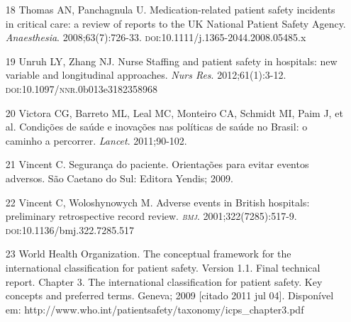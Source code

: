 \documentclass{article}
\begin{document}
\begin{itemize}
\item[18] Thomas AN, Panchagnula U. Medication-related patient safety
incidents in
critical care: a review of reports to the UK National Patient Safety Agency.
\textit{Anaesthesia}. 2008;63(7):726-33.
\textsc{doi}:10.1111/j.1365-2044.2008.05485.x

\item[19] Unruh LY, Zhang NJ. Nurse Staffing and patient safety in hospitals:
new
variable and longitudinal approaches. \textit{Nurs Res}. 2012;61(1):3-12.
\textsc{doi}:10.1097/\textsc{nnr}.0b013e3182358968

\item[20] Victora CG, Barreto ML, Leal MC, Monteiro CA, Schmidt MI, Paim J, et
al.
Condições de saúde e inovações nas políticas de saúde no Brasil: o caminho a
percorrer.
\textit{Lancet}. 2011;90-102.

\item[21] Vincent C. Segurança do paciente. Orientações para evitar eventos
adversos. São Caetano do Sul: Editora Yendis; 2009.

\item[22] Vincent C, Woloshynowych M. Adverse events in British hospitals:
preliminary retrospective record review. \textit{\textsc{bmj}}. 2001;322(7285):517-9.
\textsc{doi}:10.1136/bmj.322.7285.517

\item[23] World Health Organization. The conceptual framework for the
international
classification for patient safety. Version 1.1. Final technical report. Chapter
3. The
international classification for patient safety. Key concepts and preferred
terms. Geneva;
2009 [citado 2011 jul 04]. Disponível em:
http://www.who.int/patientsafety/taxonomy/icps\_{}chapter3.pdf

\end{itemize}
\end{document}
